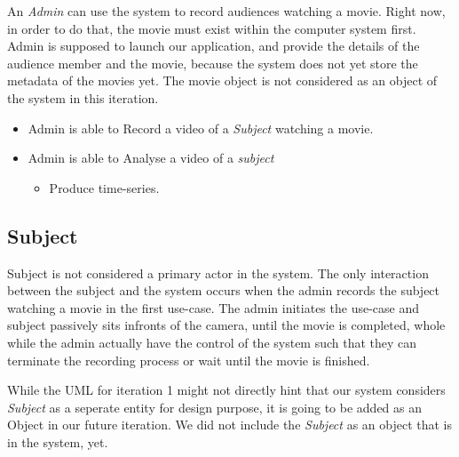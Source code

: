 \documentclass[12pt,a4paper,man]{report}
\begin{document}
An \emph{Admin} can use the system to record audiences watching a movie. Right now, in order to do that, the movie must exist within the computer system first. Admin is supposed to launch our application, and provide the details of the audience member and the movie, because the system does not yet store the metadata of the movies yet. The movie object is not considered as an object of the system in this iteration.

\begin{itemize}
\item Admin is able to Record a video of a \emph{Subject} watching a movie.
\item Admin is able to Analyse a video of a \emph{subject}
\begin{itemize}
\item Produce time-series.
\end{itemize}
\end{itemize}

\subsection{Subject}
\label{sec:org9a34327}
Subject is not considered a primary actor in the system. The only interaction between the subject and the system occurs when the admin records the subject watching a movie in the first use-case. The admin initiates the use-case and subject passively sits infronts of the camera, until the movie is completed, whole while the admin actually have the control of the system such that they can terminate the recording process or wait until the movie is finished.

While the UML for iteration 1 might not directly hint that our system considers \emph{Subject} as a seperate entity for design purpose, it is going to be added as an Object in our future iteration. We did not include the \emph{Subject} as an object that is in the system, yet. 
\end{document}

